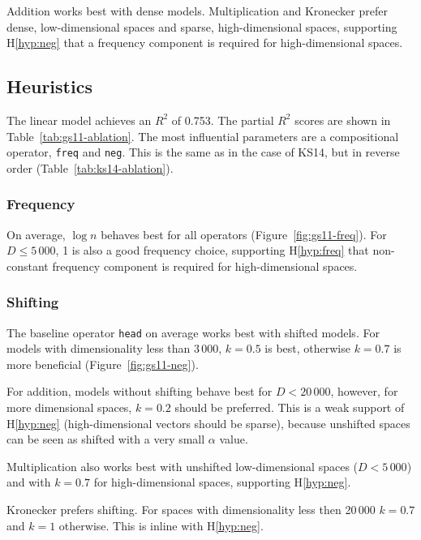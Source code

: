 Addition works best with dense models. Multiplication and Kronecker prefer dense, low-dimensional spaces and sparse, high-dimensional spaces, supporting H\ref{hyp:neg} that a frequency component is required for high-dimensional spaces.

\subsection{Heuristics}
\label{sec:heuristics-gs11}

The linear model achieves an $R^2$ of 0.753. The partial $R^2$ scores are shown in Table~\ref{tab:gs11-ablation}. The most influential parameters are a compositional operator, \texttt{freq} and \texttt{neg}. This is the same as in the case of KS14, but in reverse order (Table~\ref{tab:ks14-ablation}).

\subsubsection{Frequency}


On average, $\log n$ behaves best for all operators (Figure~\ref{fig:gs11-freq}). For $D \leq 5\,000$, 1 is also a good frequency choice, supporting H\ref{hyp:freq} that non-constant frequency component is required for high-dimensional spaces.

\subsubsection{Shifting}

The baseline operator \texttt{head} on average works best with shifted models. For models with dimensionality less than 3\,000, $k = 0.5$ is best, otherwise $k = 0.7$ is more beneficial (Figure~\ref{fig:gs11-neg}).

For addition, models without shifting behave best for $D < 20\,000$, however, for more dimensional spaces, $k = 0.2$ should be preferred. This is a weak support of H\ref{hyp:neg} (high-dimensional vectors should be sparse), because unshifted spaces can be seen as shifted with a very small $\alpha$ value.

Multiplication also works best with unshifted low-dimensional spaces ($D < 5\,000$) and with $k = 0.7$ for high-dimensional spaces, supporting H\ref{hyp:neg}.

Kronecker prefers shifting. For spaces with dimensionality less then 20\,000 $k = 0.7$ and $k = 1$ otherwise. This is inline with H\ref{hyp:neg}.

